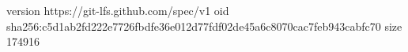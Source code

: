 version https://git-lfs.github.com/spec/v1
oid sha256:c5d1ab2fd222e7726fbdfe36e012d77fdf02de45a6c8070cac7feb943cabfc70
size 174916
